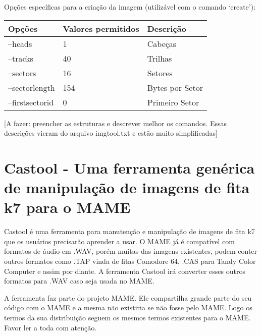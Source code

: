 \documentclass[letterpaper,10pt,brazil]{sphinxmanual}
\begin{document}
Opções específicas para a criação da imagem (utilizável com o comando `create'):

\noindent\begin{tabulary}{\linewidth}{|L|L|L|}
\hline

Opções
&
Valores permitidos
&
Descrição
\\
\hline
--heads
&
1
&
Cabeças
\\
\hline
--tracks
&
40
&
Trilhas
\\
\hline
--sectors
&
16
&
Setores
\\
\hline
--sectorlength
&
154
&
Bytes por Setor
\\
\hline
--firstsectorid
&
0
&
Primeiro Setor
\\
\hline\end{tabulary}


{[}A fazer: preencher as estruturas e descrever melhor os comandos.
Essas descrições vieram do arquivo imgtool.txt e estão muito
simplificadas{]}


\section{Castool - Uma ferramenta genérica de manipulação de imagens de fita k7 para o MAME}
\label{tools/castool::doc}\label{tools/castool:castool-uma-ferramenta-generica-de-manipulacao-de-imagens-de-fita-k7-para-o-mame}
Castool é uma ferramenta para manutenção e manipulação de imagens de
fita k7 que os usuários precisarão aprender a usar. O MAME já é
compatível com formatos de áudio em .WAV, porém muitas das imagens
existentes, podem conter outros formatos como .TAP vinda de fitas
Comodore 64, .CAS para Tandy Color Computer e assim por diante.
A ferramenta Castool irá converter esses outros formatos para .WAV
caso seja usada no MAME.

A ferramenta faz parte do projeto MAME. Ele compartilha grande parte do
seu código com o MAME e a mesma não existiria se não fosse pelo MAME.
Logo os termos da sua distribuição seguem os mesmos termos existentes
para o MAME.
Favor ler a toda {\hyperref[license:mame\string-license]{}} com atenção.
\end{document}
